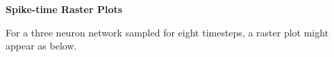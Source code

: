\documentclass[12pt]{article}
\begin{document}
\begin{posterbard}
	\begin{posterbox}
		\begin{center}\textbf{Spike-time Raster Plots}\end{center}
		For a three neuron network sampled for eight timesteps, a raster plot 
		might appear as below.
		\begin{center}
\end{center}
\end{posterbox}
\end{posterbard}
\end{document}
